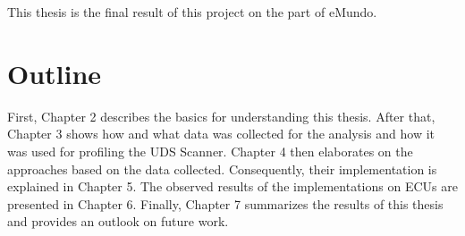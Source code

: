 This thesis is the final result of this project on the part of eMundo.

\section{Outline}

First, Chapter 2 describes the basics for understanding this thesis. After that, Chapter 3 shows how and what data was collected for the analysis and how it was used for profiling the UDS Scanner. Chapter 4 then elaborates on the approaches based on the data collected. Consequently, their implementation is explained in Chapter 5. The observed results of the implementations on ECUs are presented in Chapter 6. Finally, Chapter 7 summarizes the results of this thesis and provides an outlook on future work.
